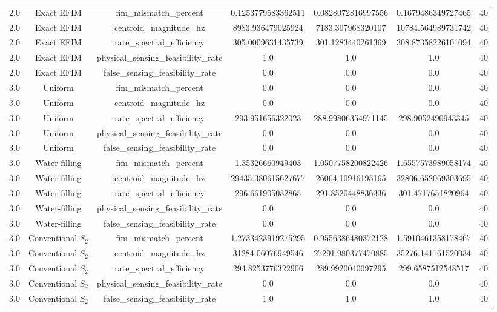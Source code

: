 \begin{table}[t]
\begin{tabular}{lcccccc}
2.0 & Exact EFIM & fim_mismatch_percent & 0.1253779583362511 & 0.0828072816997556 & 0.1679486349727465 & 40 \\
2.0 & Exact EFIM & centroid_magnitude_hz & 8983.936479025924 & 7183.307968320107 & 10784.564989731742 & 40 \\
2.0 & Exact EFIM & rate_spectral_efficiency & 305.0009631435739 & 301.1283440261369 & 308.87358226101094 & 40 \\
2.0 & Exact EFIM & physical_sensing_feasibility_rate & 1.0 & 1.0 & 1.0 & 40 \\
2.0 & Exact EFIM & false_sensing_feasibility_rate & 0.0 & 0.0 & 0.0 & 40 \\
3.0 & Uniform & fim_mismatch_percent & 0.0 & 0.0 & 0.0 & 40 \\
3.0 & Uniform & centroid_magnitude_hz & 0.0 & 0.0 & 0.0 & 40 \\
3.0 & Uniform & rate_spectral_efficiency & 293.951656322023 & 288.99806354971145 & 298.9052490943345 & 40 \\
3.0 & Uniform & physical_sensing_feasibility_rate & 0.0 & 0.0 & 0.0 & 40 \\
3.0 & Uniform & false_sensing_feasibility_rate & 0.0 & 0.0 & 0.0 & 40 \\
3.0 & Water-filling & fim_mismatch_percent & 1.35326660949403 & 1.0507758200822426 & 1.6557573989058174 & 40 \\
3.0 & Water-filling & centroid_magnitude_hz & 29435.380615627677 & 26064.10916195165 & 32806.652069303695 & 40 \\
3.0 & Water-filling & rate_spectral_efficiency & 296.661905032865 & 291.8520448836336 & 301.4717651820964 & 40 \\
3.0 & Water-filling & physical_sensing_feasibility_rate & 0.0 & 0.0 & 0.0 & 40 \\
3.0 & Water-filling & false_sensing_feasibility_rate & 0.0 & 0.0 & 0.0 & 40 \\
3.0 & Conventional $S_2$ & fim_mismatch_percent & 1.2733423919275295 & 0.9556386480372128 & 1.5910461358178467 & 40 \\
3.0 & Conventional $S_2$ & centroid_magnitude_hz & 31284.06076949546 & 27291.980377470885 & 35276.141161520034 & 40 \\
3.0 & Conventional $S_2$ & rate_spectral_efficiency & 294.8253776322906 & 289.9920040097295 & 299.6587512548517 & 40 \\
3.0 & Conventional $S_2$ & physical_sensing_feasibility_rate & 0.0 & 0.0 & 0.0 & 40 \\
3.0 & Conventional $S_2$ & false_sensing_feasibility_rate & 1.0 & 1.0 & 1.0 & 40 \\

\end{tabular}
\end{table}
